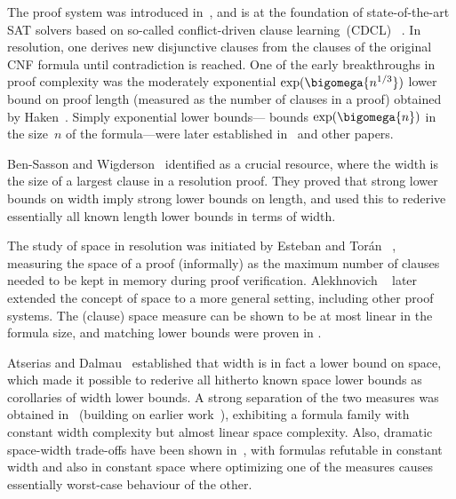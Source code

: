 The  proof system was introduced
in~\cite{Blake37Thesis}, and is at the foundation
of state-of-the-art SAT solvers based on so-called conflict-driven
clause learning~(CDCL)~%
\cite{BS97UsingCSP,MS99Grasp,MMZZM01Engineering}.
%
In resolution, one derives new disjunctive clauses 
from the clauses of the original CNF formula until 
contradiction is reached.
One of the early breakthroughs in proof complexity was the
%
%
%
moderately exponential %
%
%
%
%
%
%
$\exp(\bigomega{n^{1/3}})$   %
lower bound on proof length 
(measured as the number of clauses in a proof)
obtained by Haken~\cite{Haken85Intractability}.
%
Simply   %
exponential lower bounds---\ieComma
bounds $\exp(\bigomega{n})$
in the size~$n$ of the formula---were 
later  established in~%
\cite{CS88ManyHard,Urquhart87HardExamples}
and other papers.


Ben-Sasson and Wigderson~\cite{BW01ShortProofs}
identified 
as a crucial resource, where the width is the
size of a largest clause in a resolution proof.
They proved that strong lower bounds on width imply strong lower
bounds on length, and used this to rederive essentially all known
length lower bounds in terms of width.

The study of space in resolution was initiated by Esteban and Tor\'an~%
\cite{ET01SpaceBounds}, measuring the space of a proof (informally) as
the maximum number of clauses needed to be kept in memory during proof
verification. Alekhnovich \etal~\cite{ABRW02SpaceComplexity}
later extended the concept of space to a more general setting,
including other proof systems.
The (clause) space measure can be shown to be at most linear in the
formula size, and matching lower bounds were proven in
\cite{ABRW02SpaceComplexity,
  BG03SpaceComplexity,
  ET01SpaceBounds}.

Atserias and Dalmau~%
\cite{AD08CombinatoricalCharacterization}
established that %
width
is in fact
%
%
%
a lower bound on space, %
which made it possible
to rederive all hitherto known space lower bounds as corollaries of
width lower bounds.
%
A strong separation of the two measures
%
was obtained in~%
\cite{BN08ShortProofs}
(building on earlier 
work~\cite{Nordstrom09NarrowProofsSICOMP,NH13TowardsOptimalSeparation}),
exhibiting a formula family
with constant width complexity but almost
linear space complexity. 
%
Also, dramatic space-width trade-offs have been shown
in~\cite{Ben-Sasson09SizeSpaceTradeoffs}, 
with formulas refutable in constant width and
also in  %
constant space
%
where optimizing one of the
measures causes essentially worst-case behaviour of the 
other.
%

